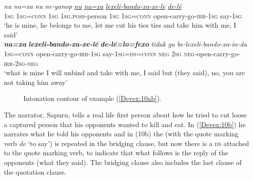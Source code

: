 \documentclass[output=paper]{LSP/langsci}
\begin{document}
\begin{exe}
\ex \label{Devex:10ab}
\begin{xlist}
\ex \label{Devex:10a}		
\gll \textit{nu}	\textit{na=xa} \textit{nu} \textit{ne-yanop} \underline{\textit{nu}} \underline{\textit{na=xa}} \underline{\textit{lexeli-bando-xa-xe-le}} \underline{\textit{de-lé}}\\
\textsc{1sg}	\textsc{1sg=conn} \textsc{1sg} \textsc{1sg.poss}-person	\textsc{1sg}	\textsc{1sg=conn} open-carry-go-\textsc{irr-1sg} say-\textsc{1sg}\\
\glt `he is mine, he belongs to me, let me cut his ties ties and take him with me, I said'\\

\ex \label{Devex:10b}		
\gll \textbf{\textit{na=xa}} \textbf{\textit{lexeli-bando-xa-xe-lé}}	\textbf{\textit{de-lé=lo=fexo}} \textit{tidak}	\textit{gu} \textit{be-lexeli-bando-xa-in-da}\\	
\textsc{1sg=conn} open-carry-go-\textsc{irr-1sg} say-\textsc{1sg=ds=conn} \textsc{neg} \textsc{2sg} \textsc{neg}-open-carry-go-\textsc{irr-2sg-neg}\\
\glt `what is mine I will unbind and take with me, I said but (they said), no, you are not taking him away'\\
\end{xlist}
\end{exe}


\begin{figure}[ht]
\caption{Intonation contour of example (\ref{Devex:10ab}). \label{DevF1}}
\end{figure}


The narrator, Sapuru, tells a real life first person  about how he tried to cut loose a captured person that his opponents wanted to kill and eat. In (\ref{Devex:10b}) he narrates what he told his opponents and in (10b) the  (with the quote marking verb \textit{de} `to say') is repeated in the bridging clause, but now there is a \textsc{ds}  attached to the quote marking verb, to indicate that what follows is the reply of the opponents (what they said). The bridging clause also includes the last clause of the quotation clause. 
\end{document}
